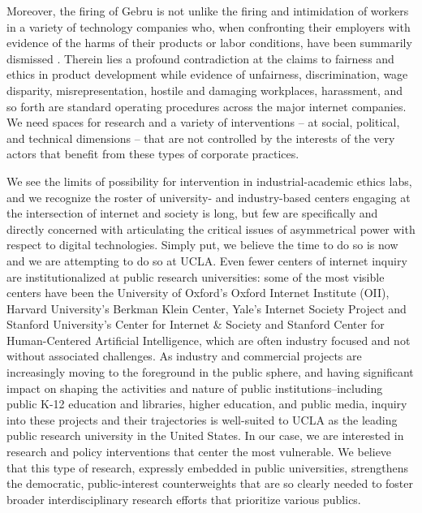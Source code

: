 \documentclass[11pt]{article}
\begin{document}
Moreover, the firing of Gebru is not unlike the firing and intimidation of workers in a variety of technology companies who, when confronting their employers with evidence of the harms of their products or labor conditions, have been summarily dismissed \cite{campbell2018tech,Kan2019,Solon2018}. Therein lies a profound contradiction at the claims to fairness and ethics in product development while evidence of unfairness, discrimination, wage disparity, misrepresentation, hostile and damaging workplaces, harassment, and so forth are standard operating procedures across the major internet companies. We need spaces for research and a variety of interventions – at social, political, and technical dimensions –  that are not controlled by the interests of the very actors that benefit from these types of corporate practices.

We see the limits of possibility for intervention in industrial-academic ethics labs, and we recognize the roster of university- and industry-based centers engaging at the intersection of internet and society is long, but few are specifically and directly concerned with articulating the critical issues of asymmetrical power with respect to digital technologies. Simply put, we believe the time to do so is now and we are attempting to do so at UCLA. Even fewer centers of internet inquiry are institutionalized at public research universities: some of the most visible centers have been the University of Oxford’s Oxford Internet Institute (OII), Harvard University’s Berkman Klein Center, Yale’s Internet Society Project and Stanford University’s Center for Internet \& Society and Stanford Center for Human-Centered Artificial Intelligence, which are often industry focused and not without associated challenges. As industry and commercial projects are increasingly moving to the foreground in the public sphere, and having significant impact on shaping the activities and nature of public institutions--including public K-12 education and libraries, higher education, and public media, inquiry into these projects and their trajectories is well-suited to UCLA as the leading public research university in the United States. In our case, we are interested in research and policy interventions that center the most vulnerable. We believe that this type of research, expressly embedded in public universities, strengthens the democratic, public-interest counterweights that are so clearly needed to foster broader interdisciplinary research efforts that prioritize various publics.
\end{document}
